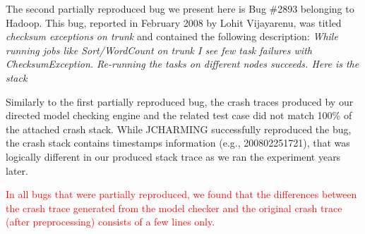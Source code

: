 \documentclass[times, doublespace]{smrauth}
\newcommand{\red}[1]{\textcolor{red}{#1}}
\begin{document}
\vspace*{0.3cm}

The second partially reproduced bug we present here is Bug \#2893 belonging to Hadoop.
This bug, reported in February 2008 by Lohit Vijayarenu,
was titled {\it checksum exceptions on trunk} and contained the following
description: {\it While running jobs like Sort/WordCount on trunk I see few
task failures with ChecksumException.
Re-running the tasks on different nodes succeeds.
Here is the stack}

\vspace*{0.3cm}

\noindent{}

\vspace*{0.3cm}

Similarly to the first partially reproduced bug, the crash traces produced by our
directed model checking engine and the related test case did not match 100\% of
the attached crash stack.
While JCHARMING successfully reproduced the bug, the crash stack contains
timestamps information (e.g., 200802251721),
that was logically different in our produced stack trace as we ran the experiment
years later.

\red{In all bugs that were partially reproduced, we found that the
differences between the crash trace generated from the model
checker and the original crash trace (after preprocessing)
consists of a few lines only.}
\end{document}
